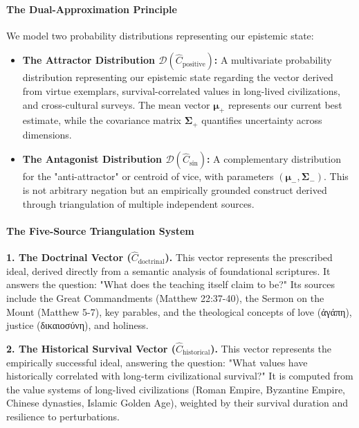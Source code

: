 \documentclass[11pt,a4paper]{article}
\theoremstyle{definition}
\theoremstyle{remark}
\begin{document}
\begin{small}
\paragraph{The Dual-Approximation Principle}

We model two probability distributions representing our epistemic state:

\begin{itemize}
    \item \textbf{The Attractor Distribution \(\mathcal{D}(\hat{C}_{\text{positive}})\):} A multivariate probability distribution representing our epistemic state regarding the vector derived from virtue exemplars, survival-correlated values in long-lived civilizations, and cross-cultural surveys. The mean vector \(\boldsymbol{\mu}_+\) represents our current best estimate, while the covariance matrix \(\boldsymbol{\Sigma}_+\) quantifies uncertainty across dimensions.
    
    \item \textbf{The Antagonist Distribution \(\mathcal{D}(\hat{C}_{\text{sin}})\):} A complementary distribution for the "anti-attractor" or centroid of vice, with parameters \((\boldsymbol{\mu}_-, \boldsymbol{\Sigma}_-)\). This is not arbitrary negation but an empirically grounded construct derived through triangulation of multiple independent sources.
\end{itemize}

\paragraph{The Five-Source Triangulation System}

\textbf{1. The Doctrinal Vector (\(\hat{C}_{\text{doctrinal}}\)).} This vector represents the prescribed ideal, derived directly from a semantic analysis of foundational scriptures. It answers the question: "What does the teaching itself claim to be?" Its sources include the Great Commandments (Matthew 22:37-40), the Sermon on the Mount (Matthew 5-7), key parables, and the theological concepts of love (ἀγάπη), justice (δικαιοσύνη), and holiness.

\textbf{2. The Historical Survival Vector (\(\hat{C}_{\text{historical}}\)).} This vector represents the empirically successful ideal, answering the question: "What values have historically correlated with long-term civilizational survival?" It is computed from the value systems of long-lived civilizations (Roman Empire, Byzantine Empire, Chinese dynasties, Islamic Golden Age), weighted by their survival duration and resilience to perturbations.


\end{small}
\end{document}
